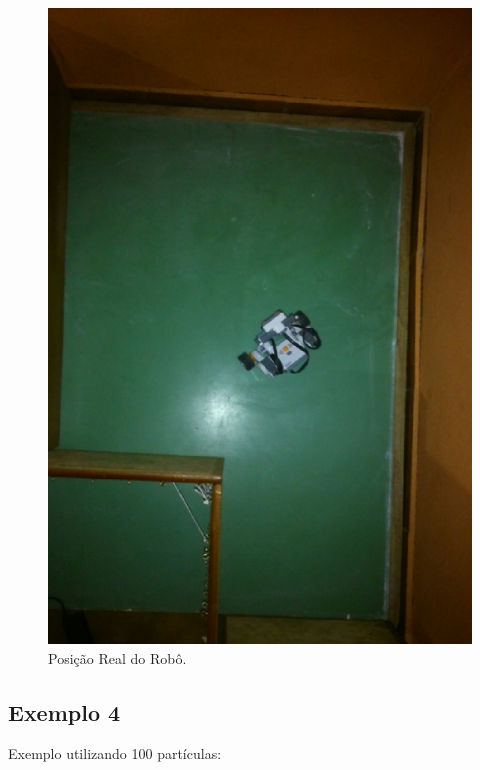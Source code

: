 \begin{figure}[H]
  \centering
  \includegraphics[scale=1]{figuras/cen1_ex3/real.eps}
  \caption[Posição Real do Robô]{Posição Real do Robô.}
  \label{img:cen1_ex3_23}
\end{figure}


\subsection{Exemplo 4}

Exemplo utilizando 100 partículas:

